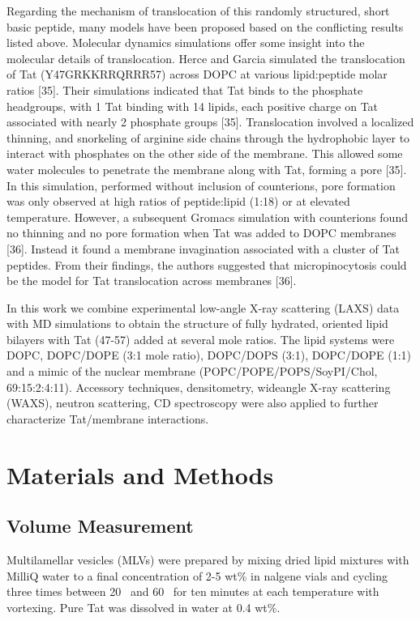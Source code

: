 Regarding the mechanism of translocation of this randomly structured, short 
basic
peptide, many models have been proposed based on the conflicting results listed 
above.
Molecular dynamics simulations offer some insight into the molecular details of 
translocation.
Herce and Garcia simulated the translocation of Tat (Y47GRKKRRQRRR57) across 
DOPC at
various lipid:peptide molar ratios [35]. Their simulations indicated that Tat 
binds to the
phosphate headgroups, with 1 Tat binding with 14 lipids, each positive charge 
on Tat associated
with nearly 2 phosphate groups [35]. Translocation involved a localized 
thinning, and
snorkeling of arginine side chains through the hydrophobic layer to interact 
with phosphates on
the other side of the membrane. This allowed some water molecules to penetrate 
the membrane
along with Tat, forming a pore [35]. In this simulation, performed without 
inclusion of
counterions, pore formation was only observed at high ratios of peptide:lipid (1:18) 
or at
elevated temperature. However, a subsequent Gromacs simulation with counterions 
found no
thinning and no pore formation when Tat was added to DOPC membranes [36]. 
Instead it found
a membrane invagination associated with a cluster of Tat peptides. From their 
findings, the authors suggested that
micropinocytosis could be the model for Tat translocation across membranes [36].

In this work we combine experimental low-angle X-ray scattering (LAXS) 
data
with MD simulations to obtain the structure of fully hydrated, oriented lipid 
bilayers with Tat
(47-57) added at several mole ratios. The lipid systems were DOPC, DOPC/DOPE 
(3:1 mole
ratio), DOPC/DOPS (3:1), DOPC/DOPE (1:1) and a mimic of the nuclear membrane
(POPC/POPE/POPS/SoyPI/Chol, 69:15:2:4:11). Accessory techniques, densitometry, 
wideangle
X-ray scattering (WAXS), neutron scattering, CD spectroscopy were also applied 
to
further characterize Tat/membrane interactions.

\section{Materials and Methods}
\subsection{Volume Measurement}
Multilamellar vesicles (MLVs) were prepared by mixing dried lipid mixtures with 
MilliQ
water to a final concentration of 2-5 wt\% in nalgene vials and cycling three 
times between 20 \textcelsius\ 
and 60 \textcelsius\ for ten minutes at each temperature with vortexing. 
Pure Tat was dissolved in water at 0.4 wt\%.

